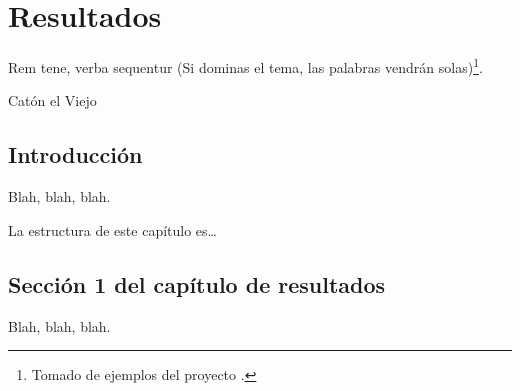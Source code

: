 %
%
%
% 
%
%
%
%

\chapter{Resultados}
\label{cha:resultados}


\begin{FraseCelebre}
  \begin{Frase}
    Rem tene, verba sequentur (Si dominas el tema, las palabras vendrán
    solas)\footnote{Tomado de ejemplos del proyecto \texis{}.}.
  \end{Frase}
  \begin{Fuente}
    Catón el Viejo
  \end{Fuente}
\end{FraseCelebre}

\section{Introducción}
\label{sec:results-introduction}

Blah, blah, blah.

La estructura de este capítulo es\ldots


\section{Sección 1 del capítulo de resultados}
\label{sec:results-1}

Blah, blah, blah.



